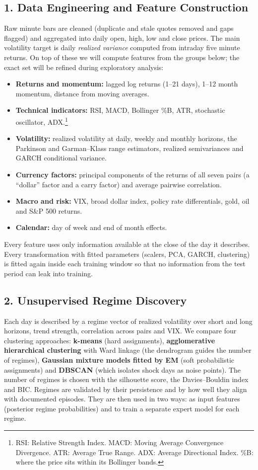 \documentclass[11pt,a4paper]{article}
\begin{document}
\subsection*{1. Data Engineering and Feature Construction}
Raw minute bars are cleaned (duplicate and stale quotes removed and gaps flagged) and aggregated into daily
open, high, low and close prices. The main volatility target is daily \emph{realized variance} computed from intraday five minute returns.
On top of these we will compute features from the groups below; the exact set will be refined during
exploratory analysis:
\begin{itemize}
  \item \textbf{Returns and momentum:} lagged log returns (1--21 days), 1--12 month momentum, distance from moving averages.
  \item \textbf{Technical indicators:} RSI, MACD, Bollinger \%B, ATR, stochastic oscillator, ADX.\footnote{RSI: Relative Strength Index. MACD: Moving Average Convergence Divergence. ATR: Average True Range. ADX: Average Directional Index. \%B: where the price sits within its Bollinger bands.}
  \item \textbf{Volatility:} realized volatility at daily, weekly and monthly horizons, the Parkinson and Garman--Klass range estimators, realized semivariances and GARCH conditional variance.
  \item \textbf{Currency factors:} principal components of the returns of all seven pairs (a ``dollar'' factor and a carry factor) and average pairwise correlation.
  \item \textbf{Macro and risk:} VIX, broad dollar index, policy rate differentials, gold, oil and S\&P 500 returns.
  \item \textbf{Calendar:} day of week and end of month effects.
\end{itemize}
Every feature uses only information available at the close of the day it describes. Every transformation with
fitted parameters (scalers, PCA, GARCH, clustering) is fitted again inside each training window so that no information from the test period can leak into training.

\subsection*{2. Unsupervised Regime Discovery}
Each day is described by a regime vector of realized volatility over short and long horizons, trend strength, correlation across pairs and VIX. We compare four clustering approaches: \textbf{k-means} (hard assignments),
\textbf{agglomerative hierarchical clustering} with Ward linkage (the dendrogram guides the number of regimes),
\textbf{Gaussian mixture models fitted by EM} (soft probabilistic assignments) and \textbf{DBSCAN} (which isolates shock days as noise points). The number of regimes is chosen with the silhouette score, the Davies--Bouldin index and BIC. Regimes are validated by their persistence and by how well they align with
documented episodes. They are then used in two ways: as input features (posterior regime probabilities) and
to train a separate expert model for each regime.
\end{document}
